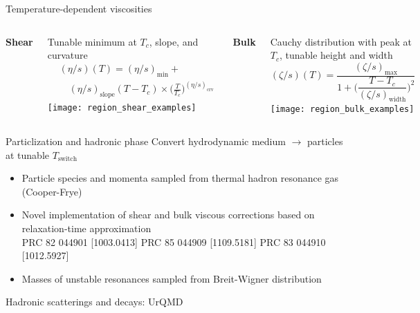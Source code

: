 \documentclass{beamer}
\newcommand{\es}{(\eta/s)}
\newcommand{\zs}{(\zeta/s)}
\begin{document}
\begin{frame}{Temperature-dependent viscosities}
  \vspace{-1em}
  \begin{columns}[t]
    \begin{center}
      \bf Shear
    \end{center}
    Tunable minimum at $T_c$, slope, and curvature
    \begin{align*}
      &\es(T) = \es_\text{min} + {} \\
      &\quad \es_\text{slope}(T - T_c)
        \times \biggl( \frac{T}{T_c} \biggr)^{\es_\text{crv}}
    \end{align*}
    \texttt{[image: region\_shear\_examples]}
    \begin{center}
      \bf Bulk
    \end{center}
    Cauchy distribution with peak at $T_c$, tunable height and width
    \begin{equation*}
      \zs(T) = \frac{
        \zs_\text{max}
      }{
        1 + \biggl( \dfrac{T - T_c}{\zs_\text{width}} \biggr)^2
      }
    \end{equation*}
    \texttt{[image: region\_bulk\_examples]}
  \end{columns}
\end{frame}

\begin{frame}[t]{Particlization and hadronic phase}
  \medskip
  Convert hydrodynamic medium $\rightarrow$ particles at tunable $T_\text{switch}$
  \begin{itemize}
    \item Particle species and momenta sampled from thermal hadron resonance gas (Cooper-Frye)
    \item Novel implementation of shear and bulk viscous corrections based on relaxation-time approximation \\
      {\tiny PRC 82 044901 [1003.0413] \quad PRC 85 044909 [1109.5181] \quad PRC 83 044910 [1012.5927]}
    \item Masses of unstable resonances sampled from Breit-Wigner distribution
  \end{itemize}
  \bigskip
  Hadronic scatterings and decays: UrQMD
\end{frame}

\end{document}
